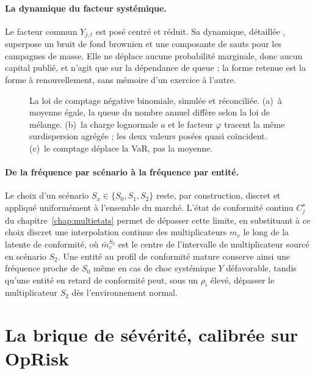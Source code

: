 \paragraph{La dynamique du facteur systémique.} Le facteur commun $Y_{j,t}$ est posé centré
et réduit. Sa dynamique, détaillée \matcomp, superpose un bruit de fond
brownien et une composante de sauts pour les campagnes de masse. Elle ne déplace aucune
probabilité marginale, donc aucun capital publié, et n'agit que sur la dépendance de queue ; la
forme retenue est la forme à renouvellement, sans mémoire d'un exercice à l'autre.

\begin{figure}[htbp]\centering
{}
\caption{La loi de comptage négative binomiale, simulée et réconciliée. (a)~à moyenne égale,
la queue du nombre annuel diffère selon la loi de mélange. (b)~la charge lognormale $a$ et le
facteur $\varphi$ tracent la même surdispersion agrégée ; les deux valeurs posées quasi
coïncident. (c)~le comptage déplace la VaR, pas la moyenne.}
\label{soc:fig:nb}
\end{figure}

\paragraph{De la fréquence par scénario à la fréquence par entité.} Le choix
d'un scénario $S_x \in \{S_0, S_1, S_2\}$ reste, par construction, discret et
appliqué uniformément à l'ensemble du marché. L'état de conformité continu
$C^\star_j$ du chapitre~\ref{chap:multietats} permet de dépasser cette
limite, en substituant à ce choix discret une interpolation continue des multiplicateurs
$m_v$ le long de la latente de conformité,
où $\bar{m}_v^{S_2}$ est le centre de l'intervalle de multiplicateur sourcé
en scénario $S_2$. Une entité au profil de conformité mature conserve ainsi
une fréquence proche de $S_0$ même en cas de choc systémique $Y$
défavorable, tandis qu'une entité en retard de conformité peut, sous un
$\rho_i$ élevé, dépasser le multiplicateur $S_2$ dès l'environnement normal.



\section{La brique de sévérité, calibrée sur OpRisk}
\label{soc:sec:severite}

